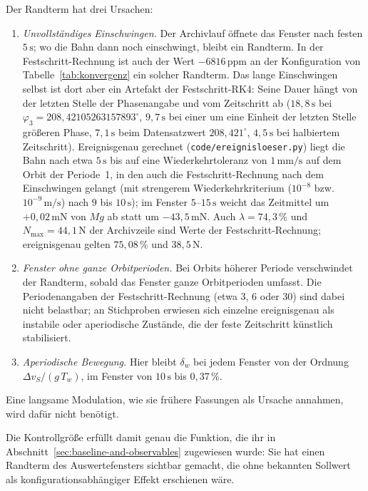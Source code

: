 \documentclass[12pt,a4paper]{report}
\begin{document}
Der Randterm hat drei Ursachen:

\begin{enumerate}
  \item \emph{Unvollständiges Einschwingen.} Der Archivlauf öffnete das
  Fenster nach festen $5\,\mathrm{s}$; wo die Bahn dann noch einschwingt,
  bleibt ein Randterm. In der Festschritt-Rechnung ist auch der Wert
  $-6816\,\mathrm{ppm}$ an der Konfiguration von
  Tabelle~\ref{tab:konvergenz} ein solcher Randterm. Das lange
  Einschwingen selbst ist dort aber ein Artefakt der Festschritt-RK4: Seine
  Dauer hängt von der letzten Stelle der Phasenangabe und vom Zeitschritt
  ab ($18{,}8\,\mathrm{s}$ bei $\varphi_3 = 208{,}42105263157893^\circ$,
  $9{,}7\,\mathrm{s}$ bei einer um eine Einheit der letzten Stelle größeren
  Phase, $7{,}1\,\mathrm{s}$ beim Datensatzwert $208{,}421^\circ$,
  $4{,}5\,\mathrm{s}$ bei halbiertem Zeitschritt). Ereignisgenau gerechnet
  (\texttt{code/ereignisloeser.py}) liegt die Bahn nach etwa
  $5\,\mathrm{s}$ bis auf eine Wiederkehrtoleranz von $1\,\mathrm{mm/s}$
  auf dem Orbit der Periode~1, in den auch die Festschritt-Rechnung nach
  dem Einschwingen gelangt (mit strengerem Wiederkehrkriterium
  ($10^{-8}$ bzw. $10^{-9}\,\mathrm{m/s}$) nach $9$ bis $10\,\mathrm{s}$); im Fenster
  $5$--$15\,\mathrm{s}$ weicht das Zeitmittel um $+0{,}02\,\mathrm{mN}$
  von $Mg$ ab statt um $-43{,}5\,\mathrm{mN}$. Auch $\lambda = 74{,}3\,\%$
  und $N_{\max} = 44{,}1\,\mathrm{N}$ der Archivzeile sind Werte der
  Festschritt-Rechnung; ereignisgenau gelten $75{,}08\,\%$ und
  $38{,}5\,\mathrm{N}$.
  \item \emph{Fenster ohne ganze Orbitperioden.} Bei Orbits höherer
  Periode verschwindet der Randterm, sobald das Fenster ganze
  Orbitperioden umfasst. Die Periodenangaben der Festschritt-Rechnung
  (etwa 3, 6 oder 30) sind dabei nicht belastbar; an Stichproben
  erwiesen sich einzelne ereignisgenau als instabile oder aperiodische
  Zustände, die der feste Zeitschritt künstlich stabilisiert.
  \item \emph{Aperiodische Bewegung.} Hier bleibt $\delta_w$ bei jedem
  Fenster von der Ordnung $\Delta v_S/(g\,T_w)$, im Fenster von
  $10\,\mathrm{s}$ bis $0{,}37\,\%$.
\end{enumerate}

Eine langsame Modulation, wie sie frühere Fassungen als Ursache
annahmen, wird dafür nicht benötigt.

Die Kontrollgröße erfüllt damit genau die Funktion, die ihr in
Abschnitt~\ref{sec:baseline-and-observables} zugewiesen wurde: Sie hat einen Randterm des Auswertefensters sichtbar gemacht, die ohne bekannten
Sollwert als konfigurationsabhängiger Effekt erschienen wäre.
\end{document}
